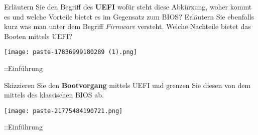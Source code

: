 \documentclass{article}
\begin{document}
\begin{tcolorbox}[colback=white!10!white,colframe=lightgray!75!black,
  savelowerto=\jobname_ex.tex]

\begin{center}
Erläutern Sie den Begriff des 
\textbf{UEFI
}wofür steht diese Abkürzung, woher kommt es und welche Vorteile bietet es im Gegensatz zum BIOS?
Erläutern Sie ebenfalls kurz was man unter dem Begriff 
\textit{Firmware 
}versteht.
Welche Nachteile bietet das Booten mittels UEFI?

\end{center}

\tcblower

\justifying
\texttt{[image: paste-17836999180289 (1).png]}

\end{tcolorbox}
\begin{tcolorbox}[colback=white!10!white,colframe=lightgray!75!black,
  savelowerto=\jobname_ex.tex]

\begin{center}
::Einführung

\end{center}

\tcblower

\justifying

\end{tcolorbox}
\begin{tcolorbox}[colback=white!10!white,colframe=lightgray!75!black,
  savelowerto=\jobname_ex.tex]

\begin{center}
Skizzieren Sie den 
\textbf{Bootvorgang
} mittels UEFI und grenzen Sie diesen von dem mittels des klassischen BIOS ab.

\end{center}

\tcblower

\justifying
\texttt{[image: paste-21775484190721.png]}

\end{tcolorbox}
\begin{tcolorbox}[colback=white!10!white,colframe=lightgray!75!black,
  savelowerto=\jobname_ex.tex]

\begin{center}
::Einführung

\end{center}

\tcblower

\justifying

\end{tcolorbox}
\end{document}
